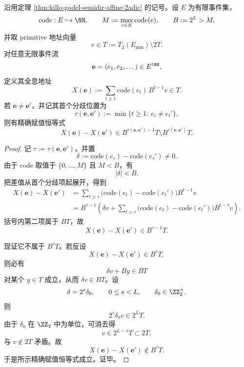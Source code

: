 \begin{theorem}\label{thm:xi-time-part9w-holographic-first-difference-valuation}
沿用定理 \ref{thm:killo-godel-semidir-affine-2adic} 的记号。设 \(E\) 为有限事件集，
\[
\mathrm{code}:E\hookrightarrow \NN,
\qquad
M:=\max_{e\in E}\mathrm{code}(e),
\qquad
B:=2^L>M,
\]
并取 primitive 地址向量
\[
v\in T:=T_2(E_{\min})\setminus 2T.
\]
对任意无限事件流
\[
\mathbf e=(e_1,e_2,\dots)\in E^{\NN},
\]
定义其全息地址
\[
X(\mathbf e):=\sum_{t\ge 1}\mathrm{code}(e_t)\,B^{t-1}v\in T.
\]
若 \(\mathbf e\neq \mathbf e'\)，并记其首个分歧位置为
\[
\tau(\mathbf e,\mathbf e')
:=
\min\{t\ge 1:\ e_t\neq e_t'\},
\]
则有精确赋值恒等式
\[
X(\mathbf e)-X(\mathbf e')
\in
B^{\tau(\mathbf e,\mathbf e')-1}T\setminus B^{\tau(\mathbf e,\mathbf e')}T.
\]
\end{theorem}
\begin{proof}
记 \(\tau:=\tau(\mathbf e,\mathbf e')\)，并置
\[
\delta:=\mathrm{code}(e_\tau)-\mathrm{code}(e_\tau')\neq 0.
\]
由于 \(\mathrm{code}\) 取值于 \(\{0,\dots,M\}\) 且 \(M<B\)，有
\[
|\delta|<B.
\]
把差值从首个分歧项起展开，得到
\[
\begin{aligned}
X(\mathbf e)-X(\mathbf e')
&=
\sum_{t\ge \tau}
\bigl(\mathrm{code}(e_t)-\mathrm{code}(e_t')\bigr)B^{t-1}v\\
&=
B^{\tau-1}
\left(
\delta v+
\sum_{t>\tau}
\bigl(\mathrm{code}(e_t)-\mathrm{code}(e_t')\bigr)B^{t-\tau}v
\right).
\end{aligned}
\]
括号内第二项属于 \(BT\)，故
\[
X(\mathbf e)-X(\mathbf e')\in B^{\tau-1}T.
\]

现证它不属于 \(B^\tau T\)。若反设
\[
X(\mathbf e)-X(\mathbf e')\in B^\tau T,
\]
则必有
\[
\delta v+By\in BT
\]
对某个 \(y\in T\) 成立，从而 \(\delta v\in BT\)。设
\[
\delta=2^s\delta_0,
\qquad
0\le s<L,
\qquad
\delta_0\in \ZZ_2^\times.
\]
则
\[
2^s\delta_0 v\in 2^L T.
\]
由于 \(\delta_0\) 在 \(\ZZ_2\) 中为单位，可消去得
\[
v\in 2^{L-s}T\subset 2T,
\]
与 \(v\notin 2T\) 矛盾。故
\[
X(\mathbf e)-X(\mathbf e')\notin B^\tau T.
\]
于是所示精确赋值恒等式成立。证毕。
\end{proof}

